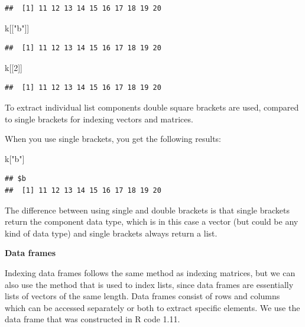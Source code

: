 \documentclass[
]{book}
\newenvironment{Shaded}{\begin{snugshade}}{\end{snugshade}}
\newcommand{\DecValTok}[1]{\textcolor[rgb]{0.00,0.00,0.81}{#1}}
\newcommand{\NormalTok}[1]{#1}
\newcommand{\StringTok}[1]{\textcolor[rgb]{0.31,0.60,0.02}{#1}}
\begin{document}
\begin{verbatim}
##  [1] 11 12 13 14 15 16 17 18 19 20
\end{verbatim}

\begin{Shaded}
\begin{Highlighting}[]
\NormalTok{k[[}\StringTok{"b"}\NormalTok{]]}
\end{Highlighting}
\end{Shaded}

\begin{verbatim}
##  [1] 11 12 13 14 15 16 17 18 19 20
\end{verbatim}

\begin{Shaded}
\begin{Highlighting}[]
\NormalTok{k[[}\DecValTok{2}\NormalTok{]]}
\end{Highlighting}
\end{Shaded}

\begin{verbatim}
##  [1] 11 12 13 14 15 16 17 18 19 20
\end{verbatim}

To extract individual list components double square brackets are used,
compared to single brackets for indexing vectors and matrices.

When you use single brackets, you get the following results:

\begin{Shaded}
\begin{Highlighting}[]
\NormalTok{k[}\StringTok{"b"}\NormalTok{]}
\end{Highlighting}
\end{Shaded}

\begin{verbatim}
## $b
##  [1] 11 12 13 14 15 16 17 18 19 20
\end{verbatim}

The difference between using single and double brackets is that single
brackets return the component data type, which is in this case a vector
(but could be any kind of data type) and single brackets always return a
list.

\textbf{Data frames}

Indexing data frames follows the same method as indexing matrices, but
we can also use the method that is used to index lists, since data
frames are essentially lists of vectors of the same length. Data frames
consist of rows and columns which can be accessed separately or both to
extract specific elements. We use the data frame that was constructed in
R code 1.11.
\end{document}
